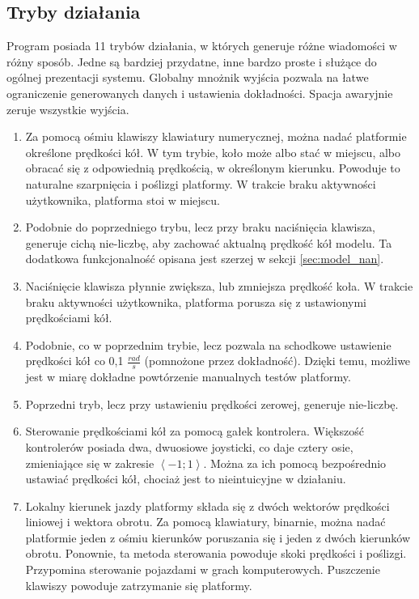 	\subsection{Tryby działania}
		Program posiada 11 trybów działania, w których generuje różne wiadomości w różny sposób.
		Jedne są bardziej przydatne, inne bardzo proste i służące do ogólnej prezentacji systemu.
		Globalny mnożnik wyjścia pozwala na łatwe ograniczenie generowanych danych i ustawienia dokładności. Spacja awaryjnie zeruje wszystkie wyjścia.
		\begin{enumerate}
			\item Za pomocą ośmiu klawiszy klawiatury numerycznej, można nadać platformie określone prędkości kół.
			W tym trybie, koło może albo stać w miejscu, albo obracać się z odpowiednią prędkością, w określonym kierunku. 
			Powoduje to naturalne szarpnięcia i poślizgi platformy. W trakcie braku aktywności użytkownika, platforma stoi w miejscu.
			\item Podobnie do poprzedniego trybu, lecz przy braku naciśnięcia klawisza, generuje cichą nie-liczbę, aby zachować aktualną prędkość kół modelu.
			Ta dodatkowa funkcjonalność opisana jest szerzej w sekcji \ref{sec:model_nan}.
			\item Naciśnięcie klawisza płynnie zwiększa, lub zmniejsza prędkość koła. W trakcie braku aktywności użytkownika, platforma porusza się 
			z ustawionymi prędkościami kół.
			\item Podobnie, co w poprzednim trybie, lecz pozwala na schodkowe ustawienie prędkości kół co 0,1 $\frac{rad}{s}$ (pomnożone przez dokładność).
			Dzięki temu, możliwe jest w miarę dokładne powtórzenie manualnych testów platformy.
			\item Poprzedni tryb, lecz przy ustawieniu prędkości zerowej, generuje nie-liczbę.
			\item Sterowanie prędkościami kół za pomocą gałek kontrolera.
			Większość kontrolerów posiada dwa, dwuosiowe joysticki, co daje cztery osie, zmieniające się w zakresie $\left<-1;1\right>$.
			Można za ich pomocą bezpośrednio ustawiać prędkości kół, chociaż jest to nieintuicyjne w działaniu.
			\item Lokalny kierunek jazdy platformy składa się z dwóch wektorów prędkości liniowej i wektora obrotu. 
			Za pomocą klawiatury, binarnie, można nadać platformie jeden z ośmiu kierunków poruszania się i jeden z dwóch kierunków obrotu.
			Ponownie, ta metoda sterowania powoduje skoki prędkości i poślizgi. Przypomina sterowanie pojazdami w grach komputerowych.
			Puszczenie klawiszy powoduje zatrzymanie się platformy.

\end{enumerate}
